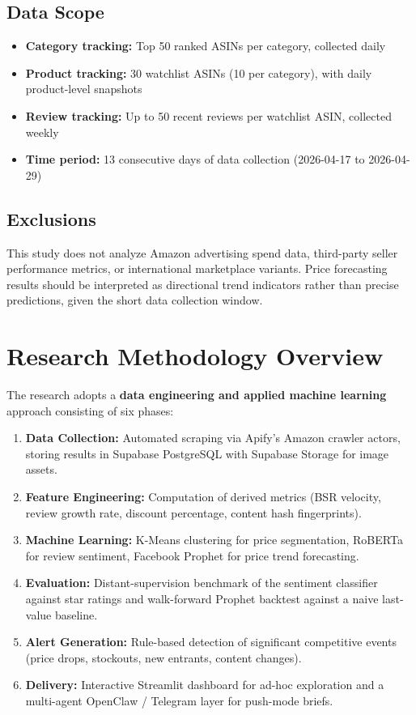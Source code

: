 \subsection{Data Scope}
\begin{itemize}
  \item \textbf{Category tracking:} Top 50 ranked ASINs per category, collected daily
  \item \textbf{Product tracking:} 30 watchlist ASINs (10 per category), with daily
  product-level snapshots
  \item \textbf{Review tracking:} Up to 50 recent reviews per watchlist ASIN,
  collected weekly
  \item \textbf{Time period:} 13 consecutive days of data collection
  (2026-04-17 to 2026-04-29)
\end{itemize}

\subsection{Exclusions}
This study does not analyze Amazon advertising spend data, third-party seller performance
metrics, or international marketplace variants. Price forecasting results should be
interpreted as directional trend indicators rather than precise predictions, given the
short data collection window.

\section{Research Methodology Overview}

The research adopts a \textbf{data engineering and applied machine learning} approach
consisting of six phases:

\begin{enumerate}
  \item \textbf{Data Collection:} Automated scraping via Apify's Amazon crawler actors,
  storing results in Supabase PostgreSQL with Supabase Storage for image assets.
  \item \textbf{Feature Engineering:} Computation of derived metrics (BSR velocity,
  review growth rate, discount percentage, content hash fingerprints).
  \item \textbf{Machine Learning:} K-Means clustering for price segmentation, RoBERTa
  for review sentiment, Facebook Prophet for price trend forecasting.
  \item \textbf{Evaluation:} Distant-supervision benchmark of the sentiment
  classifier against star ratings and walk-forward Prophet backtest against
  a naive last-value baseline.
  \item \textbf{Alert Generation:} Rule-based detection of significant competitive events
  (price drops, stockouts, new entrants, content changes).
  \item \textbf{Delivery:} Interactive Streamlit dashboard for ad-hoc exploration
  and a multi-agent OpenClaw / Telegram layer for push-mode briefs.
\end{enumerate}

